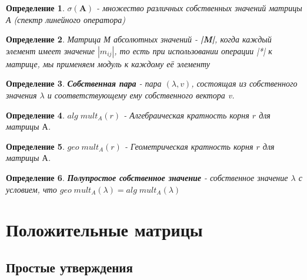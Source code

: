 \documentclass[a4paper,12pt,leqno]{article} %
\newtheorem{definition}{Определение}
\begin{document}
\begin{definition}
    $\sigma(\textbf{A}) $ - множество различных собственных значений 
    матрицы А (спектр линейного оператора)
\end{definition}

\begin{definition}
    Матрица М абсолютных значений - \textnormal{\textbf{|M|}}, когда каждый элемент
    имеет значение $|m_{ij}|$, то есть при использовании операции \textnormal{|*|} 
    к матрице, мы применяем модуль к каждому её элементу
\end{definition}

\begin{definition}
    \textbf{Собственная пара} - пара $(\lambda, v)$, состоящая из собственного значения $\lambda$
     и соответствующему ему собственного вектора v.
\end{definition}

\begin{definition}
    \textbf{$alg \; mult_A(r)$} - Алгебраическая кратность корня $r$ для матрицы $А$.
\end{definition}

\begin{definition}
    \textbf{$geo \; mult_A(r)$} - Геометрическая кратность корня $r$ для матрицы $А$.
\end{definition}

\begin{definition}
    \textbf{Полупростое собственное значение} - собственное значение $\lambda$ с условием,
     что $geo \; mult_A(\lambda) = alg \; mult_A(\lambda)$
\end{definition}
\pagebreak

\section*{Положительные матрицы}
\subsection*{Простые утверждения}
\end{document}
